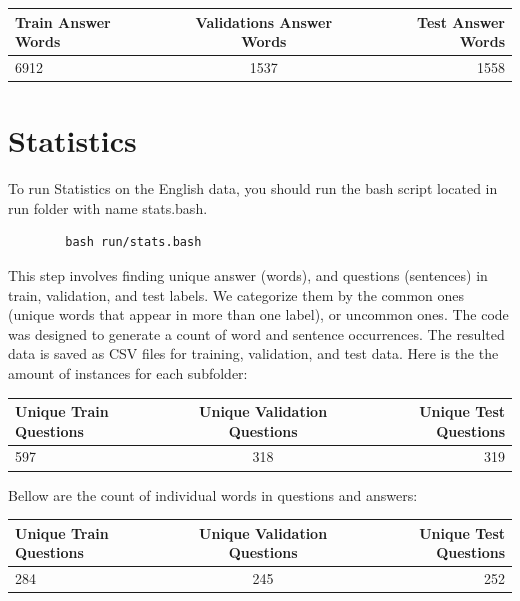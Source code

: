 \documentclass{adonis}
\begin{document}
\begin{table}[H]
  \centering
  \setlength{\tabcolsep}{0.9em}
  {\renewcommand{\arraystretch}{1.2}
    \begin{minipage}{15.5cm}
  \begin{tabular}{ | l | c | r | }
    \hline
    Train Answer Words & Validations Answer Words & Test Answer Words \\ \hline
    6912 & 1537 & 1558 \\ \hline
\end{tabular}
  \end{minipage}}
  \end{table}


 \section{Statistics}
 To run Statistics on the English data, you should run the bash script located in run folder with name stats.bash.
        \begin{verbatim}
        bash run/stats.bash
        \end{verbatim}

This step involves finding unique answer (words), and questions (sentences) in train, validation, and test labels. We categorize them by the common ones (unique words that appear in more than one label), or uncommon ones. The code was designed to generate a count of word and sentence occurrences. The resulted data is saved as CSV files for training, validation, and test data. Here is the the amount of instances for each subfolder:  


\begin{table}[H]
  \centering
  \setlength{\tabcolsep}{0.4em}
  {\renewcommand{\arraystretch}{1.2}
    \begin{minipage}{15.5cm}
  \begin{tabular}{ | l | c | r | }
    \hline
    Unique Train Questions & Unique Validation Questions & Unique Test Questions \\ \hline
    597 & 318 & 319 \\ \hline
\end{tabular}
  \end{minipage}}
  \end{table}

Bellow are the count of individual words in questions and answers:

\begin{table}[H]
  \centering
  \setlength{\tabcolsep}{0.4em}
  {\renewcommand{\arraystretch}{1.2}
    \begin{minipage}{15.5cm}
  \begin{tabular}{ | l | c | r | }
    \hline
    Unique Train Questions & Unique Validation Questions & Unique Test Questions \\ \hline
    284 & 245 & 252 \\ \hline
\end{tabular}
  \end{minipage}}
  \end{table}
\end{document}
